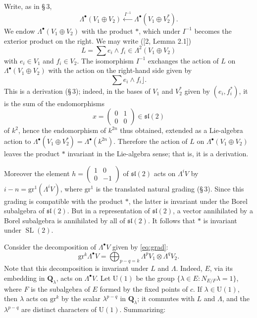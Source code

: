 \documentclass[11pt,a4paper]{article}
\theoremstyle{plain}
\theoremstyle{definition}
\DeclareMathOperator{\SL}{SL}
\begin{document}
Write, as in \S\,3,
\[
\Lambda^\bullet(V_1 \oplus V_2) \xleftarrow{\ I^{-1}\ } \Lambda^\bullet(V_1 \oplus V_2^*) .
\]
We endow $\Lambda^\bullet(V_1 \oplus V_2)$ with the product $*$, which under $I^{-1}$ becomes the exterior product on the right. We may write ([2, Lemma 2.1])
\[
L = \sum e_i \wedge f_i \in \Lambda^2(V_1 \oplus V_2)
\]
with $e_i \in V_1$ and $f_i \in V_2$. The isomorphism $I^{-1}$ exchanges the action of $L$ on $\Lambda^\bullet(V_1 \oplus V_2)$ with the action on the right-hand side given by
\[
\sum e_i \wedge f_i \rfloor .
\]
This is a derivation (\S\,3); indeed, in the bases of $V_1$ and $V_2^*$ given by $(e_i, f_i^*)$, it is the sum of the endomorphisms
\[
x = \begin{pmatrix} 0 & 1 \\ 0 & 0 \end{pmatrix} \in \mathfrak{sl}(2)
\]
of $k^2$, hence the endomorphism of $k^{2n}$ thus obtained, extended as a Lie-algebra action to $\Lambda^\bullet(V_1 \oplus V_2^*) = \Lambda^\bullet(k^{2n})$. Therefore the action of $L$ on $\Lambda^\bullet(V_1 \oplus V_2)$ leaves the product $*$ invariant in the Lie-algebra sense; that is, it is a derivation.

Moreover the element $h = \begin{pmatrix} 1 & 0 \\ 0 & -1 \end{pmatrix}$ of $\mathfrak{sl}(2)$ acts on $\Lambda^i V$ by $i - n = \mathrm{gr}^1(\Lambda^i V)$, where $\mathrm{gr}^1$ is the translated natural grading (\S\,3). Since this grading is compatible with the product $*$, the latter is invariant under the Borel subalgebra of $\mathfrak{sl}(2)$. But in a representation of $\mathfrak{sl}(2)$, a vector annihilated by a Borel subalgebra is annihilated by all of $\mathfrak{sl}(2)$. It follows that $*$ is invariant under $\SL(2)$.

Consider the decomposition of $\Lambda^\bullet V$ given by \eqref{eq:grad}:
\[
\mathrm{gr}^k \Lambda^\bullet V = \bigoplus_{p-q=k} \Lambda^p V_1 \otimes \Lambda^q V_2 .
\]
Note that this decomposition is invariant under $L$ and $\Lambda$. Indeed, $E$, via its embedding in $\mathbf{Q}_\lambda$, acts on $\Lambda^\bullet V$. Let $\mathrm{U}(1)$ be the group $\{\lambda \in E : N_{E/F} \lambda = 1\}$, where $F$ is the subalgebra of $E$ formed by the fixed points of $c$. If $\lambda \in \mathrm{U}(1)$, then $\lambda$ acts on $\mathrm{gr}^k$ by the scalar $\lambda^{p-q}$ in $\mathbf{Q}_\lambda$; it commutes with $L$ and $\Lambda$, and the $\lambda^{p-q}$ are distinct characters of $\mathrm{U}(1)$. Summarizing:
\end{document}
